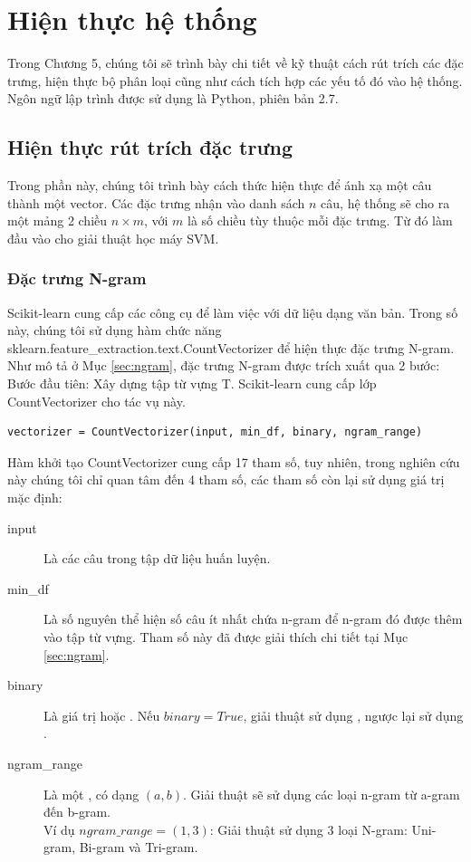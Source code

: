 \chapter{Hiện thực hệ thống} \label{sec:hienthuchethong}
\thispagestyle{empty}
Trong Chương 5, chúng tôi sẽ trình bày chi tiết về kỹ thuật cách rút trích các đặc trưng, hiện thực bộ phân loại cũng như cách tích hợp các yếu tố đó vào hệ thống. Ngôn ngữ lập trình được sử dụng là Python, phiên bản 2.7.
\pagebreak
\section{Hiện thực rút trích đặc trưng}
Trong phần này, chúng tôi trình bày cách thức hiện thực để ánh xạ một câu thành một vector. Các đặc trưng nhận vào danh sách $n$ câu, hệ thống sẽ cho ra một mảng 2 chiều $n \times m$, với $m$ là số chiều tùy thuộc mỗi đặc trưng. Từ đó làm đầu vào cho giải thuật học máy SVM.
\subsection*{Đặc trưng N-gram}
Scikit-learn cung cấp các công cụ để làm việc với dữ liệu dạng văn bản. Trong số này, chúng tôi sử dụng hàm chức năng sklearn.feature\_extraction.text.CountVectorizer để hiện thực đặc trưng N-gram. Như mô tả ở Mục \ref{sec:ngram}, đặc trưng N-gram được trích xuất qua 2 bước:\\

Bước đầu tiên: Xây dựng tập từ vựng T. Scikit-learn cung cấp lớp CountVectorizer cho tác vụ này.
\begin{lstlisting}
vectorizer = CountVectorizer(input, min_df, binary, ngram_range)
\end{lstlisting}
Hàm khởi tạo CountVectorizer cung cấp 17 tham số, tuy nhiên, trong nghiên cứu này chúng tôi chỉ quan tâm đến 4 tham số, các tham số còn lại sử dụng giá trị mặc định:
\begin{description}
\item[input] Là các câu trong tập dữ liệu huấn luyện.
\item[min\_df] Là số nguyên thể hiện số câu ít nhất chứa n-gram để n-gram đó được thêm vào tập từ vựng. Tham số này đã được giải thích chi tiết tại Mục \ref{sec:ngram}.
\item[binary] Là giá trị  hoặc . Nếu $binary=True$, giải thuật sử dụng , ngược lại sử dụng .\footnotemark
 \item[ngram\_range] Là một , có dạng $(a, b)$. Giải thuật sẽ sử dụng các loại n-gram từ a-gram đến b-gram. \\
 Ví dụ $ngram\_range = (1,3)$: Giải thuật sử dụng 3 loại N-gram: Uni-gram, Bi-gram và Tri-gram.
\end{description}

